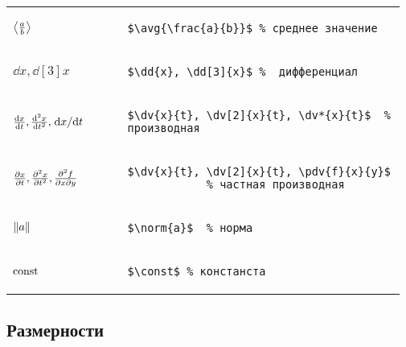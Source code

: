 \noindent
\begin{tabular}{S{0.28\linewidth} S{0.685\linewidth}}
    \vspace{-10pt}$\left\langle {\frac{a}{b}} \right\rangle$ &
        \begin{lstlisting}[style = listtable, gobble = 10]
            $\avg{\frac{a}{b}}$ % среднее значение
        \end{lstlisting} \\
    $\dd{x}, \dd[3]{x}$ &
        \begin{lstlisting}[style = listtable, gobble = 10]
            $\dd{x}, \dd[3]{x}$ %  дифференциал
        \end{lstlisting} \\
    \vspace{-10pt}$\dv{x}{t}, \dv[2]{x}{t}, \dv*{x}{t}$ &
        \begin{lstlisting}[style = listtable, gobble = 10]
            $\dv{x}{t}, \dv[2]{x}{t}, \dv*{x}{t}$  % производная
        \end{lstlisting} \\
    \vspace{-10pt}$\pdv{x}{t}, \pdv[2]{x}{t}, \pdv{f}{x}{y}$ &
        \begin{lstlisting}[style = listtable, gobble = 10]
            $\dv{x}{t}, \dv[2]{x}{t}, \pdv{f}{x}{y}$
            % частная производная
        \end{lstlisting} \\
    $\norm{a}$ &
        \begin{lstlisting}[style = listtable, gobble = 10]
            $\norm{a}$  % норма
        \end{lstlisting} \\
    $\mathrm{const}$ &
        \begin{lstlisting}[style = listtable, gobble = 10]
            $\const$ % констанста
        \end{lstlisting} \\
\end{tabular}



\subsection{Размерности}

